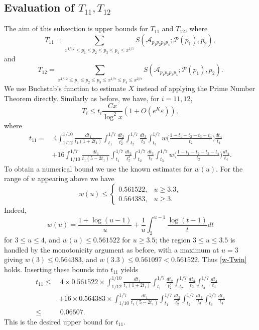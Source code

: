 \documentclass[12pt, a4paper]{amsart}
\def\leq{\leqslant}
\def\le{\leqslant}
\def\ge{\geqslant}
\theoremstyle{plain}
\theoremstyle{remark}
\numberwithin{equation}{section}
\begin{document}
\subsection{Evaluation of $T_{11},T_{12}$}
The aim of this subsection is upper bounds for $T_{11}$ and $T_{12}$, where
\[
T_{11} = \sum_{x^{1/12} \leq p_1 \le p_2 \le p_3 \le p_4 \le x^{1/7} } S(\mathscr{A}_{p_1 p_2 p_3 p_4}; \mathscr{P}(p_1), p_2),
\]
and 
\[
T_{12} = \sum_{x^{1/12} \leq p_1 \le p_2 \le p_3 \le x^{1/7} \leq p_4 \le x^{2/7}} S(\mathscr{A}_{p_1 p_2 p_3 p_4}; \mathscr{P}(p_1), p_2).
\]
We use Buchstab's function to estimate $X$ instead of applying the Prime Number Theorem directly.
Similarly as before, we have, for $i=11,12$,
\begin{equation}\label{T11-12}
T_i \le  t_i \dfrac{Cx}{\log^2 x} (1+O(e^K\varepsilon)),
\end{equation}
where
\begin{equation}\label{t11}
\begin{aligned}
t_{11}
= &\ 4\int_{1/12}^{1/10}\frac{dt_1}{t_1(1+2t_1)}\int_{t_1}^{1/7}\frac{dt_2}{t_2^2}\int_{t_2}^{1/7}\frac{dt_3}{t_3}\int_{t_3}^{1/7} w\bigg(\frac{1-t_1-t_2-t_3-t_4}{t_2}\bigg)\frac{dt_4}{t_4}\\
&+16\int_{1/10}^{1/7}\frac{dt_1}{t_1(5-2t_1)}\int_{t_1}^{1/7}\frac{dt_2}{t_2^2}\int_{t_2}^{1/7}\frac{dt_3}{t_3}\int_{t_3}^{1/7} w\bigg(\frac{1-t_1-t_2-t_3-t_4}{t_2}\bigg)\frac{dt_4}{t_4}.
\end{aligned}
\end{equation}
To obtain a numerical bound we use the known estimates for $w(u)$.
For the range of $u$ appearing above we have 
\begin{equation}\label{w-Twin}
w(u)\le \begin{cases} 0.561522, & u \ge 3.3, \\ 
0.564383, & u \ge 3.  
\end{cases} 
\end{equation}
Indeed, 
\[
w(u)=\frac{1+\log(u-1)}{u}+\frac1u\int_2^{u-1}\frac{\log(t-1)}{t}dt
\] 
for $3\le u\le 4$, and $w(u)\le 0.561522$ for $u\ge 3.5$; the region $3\le u\le 3.5$ is handled by the monotonicity
argument as before, with a maximum at $u=3$ giving $w(3)\le0.564383$, and $w(3.3)\le0.561097<0.561522$.
Thus \eqref{w-Twin} holds. Inserting these bounds into $t_{11}$ yields
\[
\begin{aligned}
t_{11}
\le &\ 4\times 0.561522\times \int_{1/12}^{1/10}\frac{dt_1}{t_1(1+2t_1)}\int_{t_1}^{1/7}\frac{dt_2}{t_2^2}\int_{t_2}^{1/7}\frac{dt_3}{t_3}\int_{t_3}^{1/7}\frac{dt_4}{t_4}\\
&+16\times 0.564383\times\int_{1/10}^{1/7}\frac{dt_1}{t_1(5-2t_1)}\int_{t_1}^{1/7}\frac{dt_2}{t_2^2}\int_{t_2}^{1/7}\frac{dt_3}{t_3}\int_{t_3}^{1/7}\frac{dt_4}{t_4}\\
\le &\ 0.06507.
\end{aligned}
\]
This is the desired upper bound for $t_{11}$.
\end{document}
